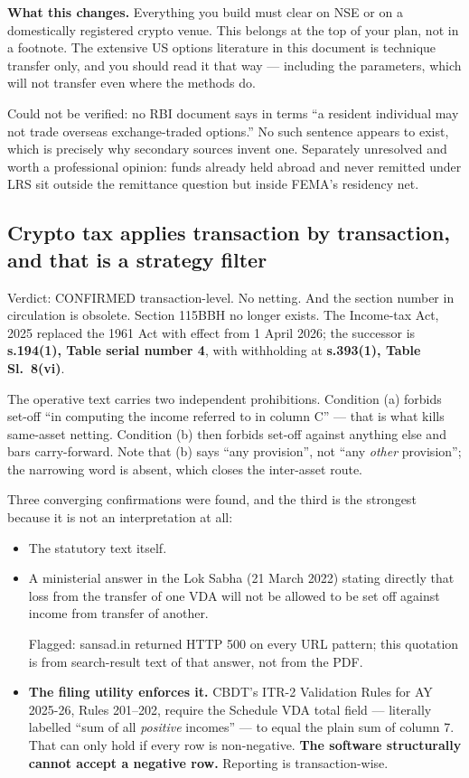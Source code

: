 \documentclass[11pt,a4paper]{article}
\newcommand{\srcnote}[1]{{\footnotesize\color{soft}#1\par}}
\begin{document}
\textbf{What this changes.} Everything you build must clear on NSE or on a
domestically registered crypto venue. This belongs at the top of your plan, not
in a footnote. The extensive US options literature in this document is technique
transfer only, and you should read it that way --- including the parameters,
which will not transfer even where the methods do.

\srcnote{Could not be verified: no RBI document says in terms ``a resident
individual may not trade overseas exchange-traded options.'' No such sentence
appears to exist, which is precisely why secondary sources invent one. Separately
unresolved and worth a professional opinion: funds already held abroad and never
remitted under LRS sit outside the remittance question but inside FEMA's
residency net.}

\subsection{Crypto tax applies transaction by transaction, and that is a strategy filter}
\label{sec:vda}

\begin{keyfact}{Verdict: CONFIRMED transaction-level. No netting. And the section number in circulation is obsolete.}
Section 115BBH no longer exists. The Income-tax Act, 2025 replaced the 1961 Act
with effect from 1 April 2026; the successor is \textbf{s.194(1), Table serial
number 4}, with withholding at \textbf{s.393(1), Table Sl.\ 8(vi)}.
\end{keyfact}

The operative text carries two independent prohibitions. Condition (a) forbids
set-off ``in computing the income referred to in column C'' --- that is what kills
same-asset netting. Condition (b) then forbids set-off against anything else and
bars carry-forward. Note that (b) says ``any provision'', not ``any \emph{other}
provision''; the narrowing word is absent, which closes the inter-asset route.

Three converging confirmations were found, and the third is the strongest because
it is not an interpretation at all:

\begin{itemize}
\item The statutory text itself.
\item A ministerial answer in the Lok Sabha (21 March 2022) stating directly that
loss from the transfer of one VDA will not be allowed to be set off against income
from transfer of another. \srcnote{Flagged: sansad.in returned HTTP 500 on every
URL pattern; this quotation is from search-result text of that answer, not from
the PDF.}
\item \textbf{The filing utility enforces it.} CBDT's ITR-2 Validation Rules for
AY 2025-26, Rules 201--202, require the Schedule VDA total field --- literally
labelled ``sum of all \emph{positive} incomes'' --- to equal the plain sum of
column 7. That can only hold if every row is non-negative. \textbf{The software
structurally cannot accept a negative row.} Reporting is transaction-wise.
\end{itemize}
\end{document}
